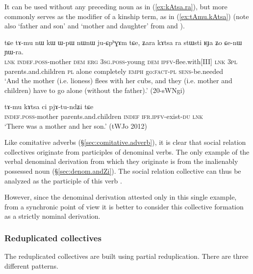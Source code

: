 It can be used without any preceding noun as in (\ref{ex:kAtsa.ra}), but more commonly serves as the modifier of a kinship term, as in (\ref{ex:tAmu.kAtsa}) (note also  `father and son' and  `mother and daughter' from  and ).

\begin{exe}
\ex \label{ex:kAtsa.ra}
\gll tɕe tɤ-mu nɯ kɯ ɯ-pɯ nɯnɯ ju-ɕpʰɣɤm tɕe, ʑara kɤtsa ra stɯsti ʁɟa ʑo ɕe-nɯ ɲɯ-ra. \\
\textsc{lnk} \textsc{indef}.\textsc{poss}-mother \textsc{dem} \textsc{erg} \textsc{3sg}.\textsc{poss}-young \textsc{dem} \textsc{ipfv}-flee.with[III] \textsc{lnk} \textsc{3pl} parents.and.children \textsc{pl} alone completely \textsc{emph} go:\textsc{fact}-\textsc{pl} \textsc{sens}-be.needed \\
\glt `And the mother (i.e. lioness) flees with her cubs, and they (i.e. mother and children) have to go alone (without the father).' (20-sWNgi)
\end{exe}

\begin{exe}
\ex \label{ex:tAmu.kAtsa}
\gll tɤ-mu kɤtsa ci pjɤ-tu-ndʑi tɕe \\
\textsc{indef}.\textsc{poss}-mother parents.and.children \textsc{indef} \textsc{ifr}.\textsc{ipfv}-exist-\textsc{du} \textsc{lnk} \\
\glt `There was a mother and her son.' (tWJo 2012)
\end{exe}

Like comitative adverbs (§\ref{sec:comitative.adverb}), it is clear that social relation collectives originate from participles of denominal verbs. The only example of the verbal denominal  derivation from which they originate is  from the inalienably possessed noun  (§\ref{sec:denom.andZi}). The social relation collective  can thus be analyzed as the participle of this verb . 

However, since the  denominal derivation attested only in this single example, from a synchronic point of view it is better to consider this collective formation as a strictly nominal derivation.

\subsubsection{Reduplicated collectives} \label{sec:redp.coll}
The reduplicated collectives are built using partial reduplication. There are three different patterns.
 
